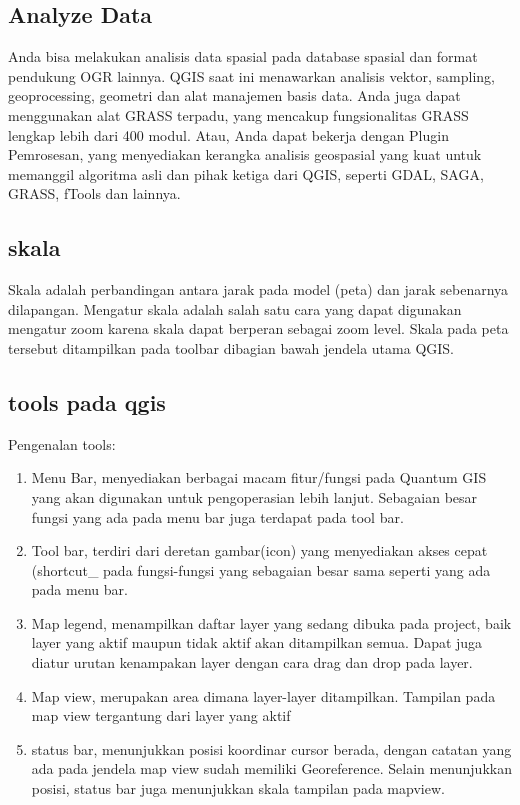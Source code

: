 	\subsection{Analyze Data}
	Anda bisa melakukan analisis data spasial pada database spasial dan format pendukung OGR lainnya. QGIS saat ini menawarkan analisis vektor, sampling, geoprocessing, geometri dan alat manajemen basis data. Anda juga dapat menggunakan alat GRASS terpadu, yang mencakup fungsionalitas GRASS lengkap lebih dari 400 modul. Atau, Anda dapat bekerja dengan Plugin Pemrosesan, yang menyediakan kerangka analisis geospasial yang kuat untuk memanggil algoritma asli dan pihak ketiga dari QGIS, seperti GDAL, SAGA, GRASS, fTools dan lainnya.
	\subsection{skala}
	Skala adalah perbandingan antara jarak pada model (peta) dan jarak sebenarnya dilapangan. Mengatur skala adalah salah satu cara yang dapat digunakan mengatur zoom karena skala dapat berperan sebagai zoom level. Skala pada peta tersebut ditampilkan pada toolbar dibagian bawah jendela utama QGIS.

	\subsection{tools pada qgis}
	Pengenalan tools:
	\begin{enumerate}
		\item Menu Bar, menyediakan berbagai macam fitur/fungsi pada Quantum GIS yang akan digunakan untuk pengoperasian lebih lanjut. Sebagaian besar fungsi yang ada pada menu bar juga terdapat pada tool bar.
		\item Tool bar, terdiri dari deretan gambar(icon) yang menyediakan akses cepat (shortcut_ pada fungsi-fungsi yang sebagaian besar sama seperti yang ada pada menu bar.
		\item Map legend, menampilkan daftar layer yang sedang dibuka pada project, baik layer yang aktif maupun tidak aktif akan ditampilkan semua. Dapat juga diatur urutan kenampakan layer dengan cara drag dan drop pada layer.
		\item Map view, merupakan area dimana layer-layer ditampilkan. Tampilan pada map view tergantung dari layer yang aktif
		\item status bar, menunjukkan posisi koordinar cursor berada, dengan catatan yang ada pada jendela map view sudah memiliki Georeference. Selain menunjukkan posisi, status bar juga menunjukkan skala tampilan pada mapview.
	\end{enumerate}

